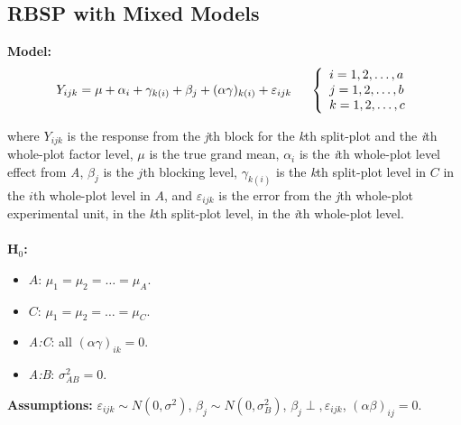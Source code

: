 \documentclass[12pt,english]{article}\usepackage[]{graphicx}\usepackage[table]{xcolor}
\begin{document}
\subsection{RBSP with Mixed Models}

\noindent\textbf{Model:} \[Y_{ijk} = \mu + \alpha_i + \gamma_{k(i)} + \beta_j + (\alpha\gamma)_{k(i)} + \varepsilon_{ijk} \hspace{0.2in} \left\{
                \begin{array}{ll}
                  i = 1,2,\dots,a\\
                  j = 1,2,\dots,b\\
                  k = 1,2,\dots,c
                \end{array}
              \right.\]

\noindent where $Y_{ijk}$ is the response from the \textit{j}th block for the \textit{k}th split-plot and the \textit{i}th whole-plot factor level, $\mu$ is the true grand mean, $\alpha_i$ is the \textit{i}th whole-plot level effect from \textit{A}, $\beta_j$ is the $j$th blocking level, $\gamma_{k(i)}$ is the \textit{k}th split-plot level in $C$ in the $i$th whole-plot level in $A$, and $\varepsilon_{ijk}$ is the error from the \textit{j}th whole-plot experimental unit, in the \textit{k}th split-plot level, in the \textit{i}th whole-plot level. \\
\vspace{0.05in}\\

\noindent \textbf{H$_0$:}
\begin{itemize}
\item $A$: $\mu_1 = \mu_2 = \dots = \mu_A$.
\item $C$: $\mu_1 = \mu_2 = \dots = \mu_C$.
\item \textit{A:C}: all $(\alpha\gamma)_{ik} = 0$.
\item \textit{A:B}: $\sigma^2_{AB} = 0$.
\end{itemize}
\vspace{0.1in}

\noindent \textbf{Assumptions:} $\varepsilon_{ijk} \sim N(0, \sigma^2)$, \hspace{0.1in}$\beta_{j} \sim N(0, \sigma_B^2)$, \hspace{0.1in} $\beta_{j} \perp , \varepsilon_{ijk}$, \hspace{0.1in} $(\alpha\beta)_{ij} = 0.$
\vspace{0.1in}
\end{document}
